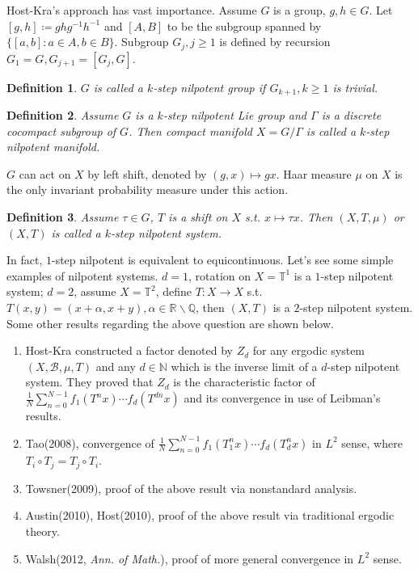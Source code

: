 \documentclass[12pt]{article}
\newtheorem{definition}{Definition}
\begin{document}
Host-Kra's approach has vast importance. Assume $G$ is a group, $g,h\in G$. Let $[g,h]\coloneqq ghg^{-1}h^{-1}$ and $[A,B]$ to be the subgroup spanned by $\{[a,b]:a\in A, b\in B \}$. Subgroup $G_j, j\ge 1$ is defined by recursion $G_1=G, G_{j+1}=[G_j,G] $. 
\begin{definition}
$G$ is called a $k$-step nilpotent group if $G_{k+1},k\ge 1$ is trivial. 
\end{definition}
\begin{definition}
Assume $G$ is a $k$-step nilpotent Lie group and $\Gamma$ is a discrete cocompact subgroup of $G$. Then compact manifold $X=G/\Gamma$ is called a $k$-step nilpotent manifold.
\end{definition}
$G$ can act on $X$ by left shift, denoted by $(g,x)\mapsto gx $. Haar measure $\mu$ on $X$ is the only invariant probability measure under this action. 
\begin{definition}
Assume $\tau\in G $, $T $ is a shift on $X$ s.t. $x\mapsto \tau x $. Then $(X,T,\mu)$ or $(X,T)$ is called a $k$-step nilpotent system.
\end{definition}
In fact, $1$-step nilpotent is equivalent to equicontinuous. Let's see some simple examples of nilpotent systems. $d=1$, rotation on $X=\mathbb T^1$ is a $1$-step nilpotent system; $d=2$, assume $X=\mathbb T^2 $, define $T:X\to X $ s.t. $T(x,y)=(x+\alpha, x+y), \alpha\in\mathbb R \backslash \mathbb Q $, then $(X,T) $ is a $2$-step nilpotent system. Some other results regarding the above question are shown below.
\begin{enumerate}
	\item Host-Kra constructed a factor denoted by $Z_d$ for any ergodic system $(X,\mathcal B,\mu,T)$ and any $d\in\mathbb N$ which is the inverse limit of a $d$-step nilpotent system. They proved that $Z_d$ is the characteristic factor of $\frac{1}{N}\sum_{n=0}^{N-1}f_1(T^nx)\cdots f_d(T^{dn}x) $ and its convergence in use of Leibman's results.
	\item Tao(2008), convergence of $\frac{1}{N}\sum_{n=0}^{N-1}f_1(T_1^nx)\cdots f_d(T_d^nx) $ in $L^2$ sense, where $T_i\circ T_j=T_j\circ T_i $.
	\item Towsner(2009), proof of the above result via nonstandard analysis.
	\item Austin(2010), Host(2010), proof of the above result via traditional ergodic theory.
	\item Walsh(2012, \textit{Ann. of Math.}), proof of more general convergence in $L^2$ sense.
\end{enumerate}
\end{document}
